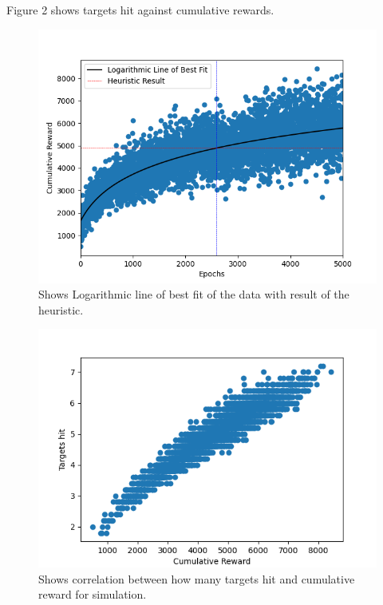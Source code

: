 Figure 2 shows targets hit against cumulative rewards.

\begin{figure}
    \centering
    \includegraphics[width=\singlefigure]{figures/figure_2.png}
    \caption{\label{fig:fig1} Shows Logarithmic line of best fit of the data with result of the heuristic.}
\end{figure}

\begin{figure}
    \centering
    \includegraphics[width=\singlefigure]{figures/figure_3.png}
    \caption{\label{fig:fig2} Shows correlation between how many targets hit and cumulative reward for simulation.}
\end{figure}